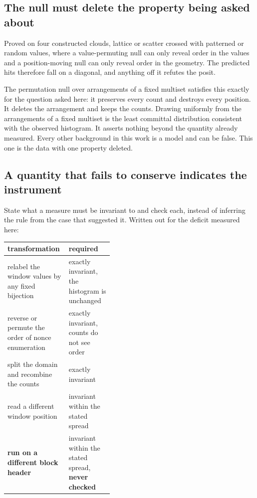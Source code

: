 \subsection{The null must delete the property being asked about}

Proved on four constructed clouds, lattice or scatter crossed with patterned or random values, where a value-permuting null can only reveal order in the values and a position-moving null can only reveal order in the geometry. The predicted hits therefore fall on a diagonal, and anything off it refutes the posit.

The permutation null over arrangements of a fixed multiset satisfies this exactly for the question asked here: it preserves every count and destroys every position. It deletes the arrangement and keeps the counts. Drawing uniformly from the arrangements of a fixed multiset is the least committal distribution consistent with the observed histogram. It asserts nothing beyond the quantity already measured. Every other background in this work is a model and can be false. This one is the data with one property deleted.

\subsection{A quantity that fails to conserve indicates the instrument}

State what a measure must be invariant to and check each, instead of inferring the rule from the case that suggested it. Written out for the deficit measured here:

\begin{center}
\begin{tabular}{@{}lp{0.42\linewidth}@{}}
\toprule
transformation & required \\
\midrule
relabel the window values by any fixed bijection & exactly invariant, the histogram is unchanged \\
reverse or permute the order of nonce enumeration & exactly invariant, counts do not see order \\
split the domain and recombine the counts & exactly invariant \\
read a different window position & invariant within the stated spread \\
\textbf{run on a different block header} & invariant within the stated spread, \textbf{never checked} \\
\bottomrule
\end{tabular}
\end{center}

